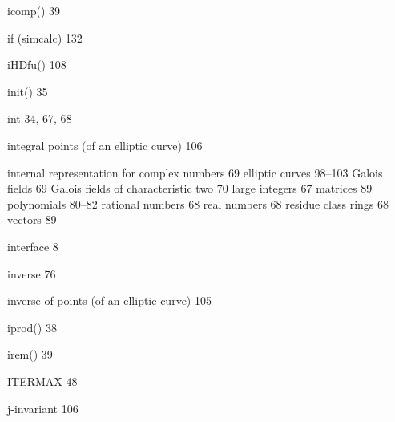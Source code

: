 \begin{theindex}
\indexspace

\item icomp() 39
\item if (simcalc) 132
\item iHDfu() 108
\item init() 35
\item int 34, 67, 68
\item integral points (of an elliptic curve) 106
\item internal representation for
  \subitem complex numbers 69
  \subitem elliptic curves 98--103
  \subitem Galois fields 69
  \subitem Galois fields of characteristic two 70 
  \subitem large integers 67
  \subitem matrices 89
  \subitem polynomials 80--82
  \subitem rational numbers 68
  \subitem real numbers 68
  \subitem residue class rings 68
  \subitem vectors 89
\item interface 8
\item inverse 76
\item inverse of points (of an elliptic curve) 105
\item iprod() 38
\item irem() 39
\item ITERMAX 48

\indexspace

\item j-invariant 106

\indexspace


\end{theindex}
